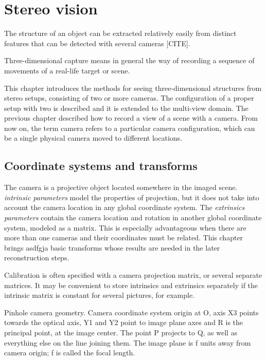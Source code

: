 \section{Stereo vision}

The structure of an object can be extracted relatively easily from distinct features that can be detected with several cameras [CITE].

Three-dimensional capture means in general the way of recording a sequence of movements of a real-life target or scene.


This chapter introduces the methods for seeing three-dimensional structures from stereo setups, consisting of two or more cameras.
The configuration of a proper setup with two is described and it is extended to the multi-view domain.
The previous chapter described how to record a view of a scene with a camera. From now on, the term camera refers to a particular camera configuration, which can be a single physical camera moved to different locations.

\subsection{Coordinate systems and transforms}

The camera is a projective object located somewhere in the imaged scene.
\textit{intrinsic parameters} model the properties of projection, but it does not take into account the camera location in any global coordinate system.
The \textit{extrinsics parameters} contain the camera location and rotation in another global coordinate system, modeled as a matrix.
This is especially advantageous when there are more than one cameras and their coordinates must be related.
\cite{hartley03multiview,heyden2005multiple}
This chapter brings asdfgja basic transforms whose results are needed in the later reconstruction steps.

Calibration is often specified with a camera projection matrix, or several separate matrices.
It may be convenient to store intrinsics and extrinsics separately if the intrinsic matrix is constant for several pictures, for example.


{Pinhole camera geometry. Camera coordinate system origin at O, axis X3 points towards the optical axis, Y1 and Y2 point to image plane axes and R is the principal point, at the image center. The point P projects to Q, as well as everything else on the line joining them. The image plane is f units away from camera origin; f is called the focal length.}

